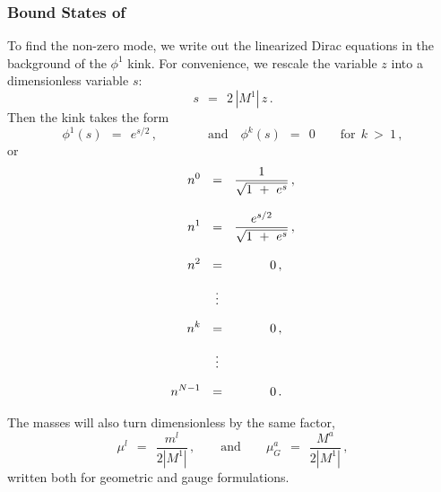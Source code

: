 \documentclass[epsfig,12pt]{article}
\def\beq{\begin{equation}}
\def\eeq{\end{equation}}
\def\beq{\begin{equation}}
\def\eeq{\end{equation}}
\begin{document}
\subsubsection{Bound States of }
\label{bound}



	To find the non-zero mode, we write out the linearized Dirac equations in the background
	of the $ \phi^1 $ kink.
	For convenience, we rescale the variable $ z $ into a dimensionless variable $ s $:
\beq
	s ~~=~~ 2\, |M^1|\, z\,.
\eeq
	Then the kink takes the form
\beq
	\phi^1(s) ~~=~~ e^{s/2}\,,\qquad\qquad\text{and}\quad \phi^k(s) ~~=~~ 0 \qquad \text{for}~~ k ~>~ 1\,,
\eeq
	or
\begin{align}
%
\notag
	n^0  & ~~=~~ \frac {             1              }
                           {    \sqrt{ 1 ~+~ e^s }      }\,, \\[3mm]
%
\notag
	n^1  & ~~=~~ \frac {          e^{s/2}           }
                           {    \sqrt{ 1 ~+~ e^s }      }\,, \\[3mm]
%
\notag
	n^2  & ~~=~~ \qquad~~\, 0\,,  \\[2mm]
%	 
 	     & ~~~\,\vdots          \\[2mm]
%
\notag
	n^k  & ~~=~~ \qquad~~\, 0\,,  \\[2mm]
%	 
\notag
 	     & ~~~\,\vdots          \\[2mm]
%
\notag
	n^{N-1} & ~~=~~ \qquad~~\, 0\,.                
\end{align}

	The masses will also turn dimensionless by the same factor,
\beq
	\mu^l  ~~=~~ \frac{ m^l }
                        {2 |M^1|}\,,
	 \qquad
	 \text{and}
	 \qquad
	 \mu_G^a ~~=~~ \frac{ M^a }
                           {2 |M^1|}\,,
\eeq
	written both for geometric and gauge formulations.
\end{document}
